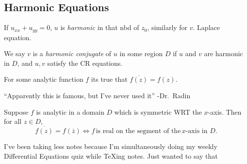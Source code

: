 \subsection{Harmonic Equations}
\begin{definition}[Harmonic]
If $u_{x x}+u_{yy}=0$, $u$ is \emph{harmonic} in that nbd of $z_0$, similarly for $v$. Laplace equation.
\end{definition}
\begin{definition}
   We say $v$ is a \emph{harmonic conjugate} of $u$ in some region $D$ if $u$ and $v$ are harmonic in $D$, and $u,v$ satisfy the CR equations. 
\end{definition}
   \begin{note}
       For some analytic function $f$ its true that $\overline{f(z)}=f(z)$.
   \end{note}
\begin{theorem}
   ``Apparently this is famous, but I've never used it'' -Dr.\ Radin
   
   Suppose $f$ is analytic in a domain $D$ which is symmetric WRT the $x$-axis. Then for all $z\in D$, \[
       \overline{f(z)}=f(\overline{z})\iff f \, \text{is real on the segment of the}\, x\text{-axis in }D. 
   \] 
\end{theorem}
\begin{note}
I've been taking less notes because I'm simultaneously doing my weekly Differential Equations quiz while \TeX{}ing notes. Just wanted to say that
\end{note}

